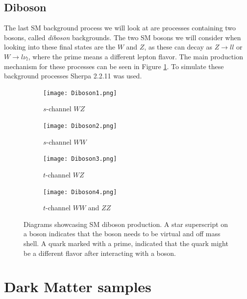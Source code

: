 \documentclass[12pt, a4paper]{book}
\begin{document}
\subsection{Diboson}
The last SM background process we will look at are processes containing two bosons, called \textit{diboson} backgrounds. The two SM bosons we will consider when looking into these final states are the $W$ and $Z$, as these can decay as $Z\rightarrow ll$ 
or $W\rightarrow l\nu_l$, where the prime means a different lepton flavor. The main production mechanism for these processes can be seen in Figure \ref{fig:Diboson_BKG}. To simulate these background processes Sherpa 2.2.11 \cite{Sherpa} was used.
\begin{figure}[!ht]
    \centering 
    \begin{subfigure}[b]{0.4\textwidth}
        \centering
        \texttt{[image: Diboson1.png]}
        \caption{$s$-channel $WZ$}
    \end{subfigure}
    \hfill
    \begin{subfigure}[b]{0.4\textwidth}
        \centering
        \texttt{[image: Diboson2.png]}
        \caption{$s$-channel $WW$}
    \end{subfigure}
    \hfill
    \begin{subfigure}[b]{0.4\textwidth}
        \centering
        \texttt{[image: Diboson3.png]}
        \caption{$t$-channel $WZ$}
    \end{subfigure}
    \hfill
    \begin{subfigure}[b]{0.4\textwidth}
        \centering
        \texttt{[image: Diboson4.png]}
        \caption{$t$-channel $WW$ and $ZZ$}
    \end{subfigure}
    \caption[Diboson production]{Diagrams showcasing SM diboson production. A star superscript on a boson indicates that the boson needs to be virtual and off mass shell.  A quark marked with a prime, indicated that the quark might be a different flavor after interacting with a boson. }\label{fig:Diboson_BKG}
\end{figure}

\section{Dark Matter samples}\label{chap:DM_sample}
\end{document}

